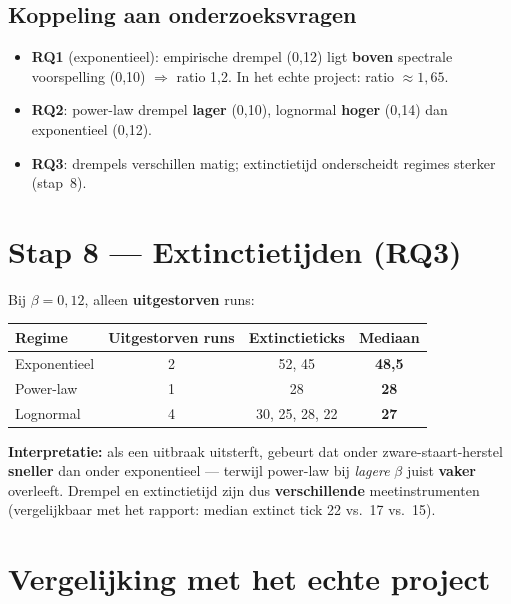 \documentclass[11pt,a4paper]{article}
\begin{document}
\subsection*{Koppeling aan onderzoeksvragen}

\begin{itemize}[leftmargin=*]
  \item \textbf{RQ1} (exponentieel): empirische drempel (0,12) ligt \textbf{boven} spectrale voorspelling (0,10) $\Rightarrow$ ratio 1,2. In het echte project: ratio $\approx 1{,}65$.
  \item \textbf{RQ2}: power-law drempel \textbf{lager} (0,10), lognormal \textbf{hoger} (0,14) dan exponentieel (0,12).
  \item \textbf{RQ3}: drempels verschillen matig; extinctietijd onderscheidt regimes sterker (stap~8).
\end{itemize}

\section{Stap 8 --- Extinctietijden (RQ3)}

Bij $\beta = 0{,}12$, alleen \textbf{uitgestorven} runs:

\begin{center}
\begin{tabular}{@{}lccc@{}}
\toprule
Regime & Uitgestorven runs & Extinctieticks & Mediaan \\
\midrule
Exponentieel & 2 & 52, 45 & \textbf{48,5} \\
Power-law & 1 & 28 & \textbf{28} \\
Lognormal & 4 & 30, 25, 28, 22 & \textbf{27} \\
\bottomrule
\end{tabular}
\end{center}

\textbf{Interpretatie:} als een uitbraak uitsterft, gebeurt dat onder zware-staart-herstel \textbf{sneller} dan onder exponentieel --- terwijl power-law bij \emph{lagere} $\beta$ juist \textbf{vaker} overleeft. Drempel en extinctietijd zijn dus \textbf{verschillende} meetinstrumenten (vergelijkbaar met het rapport: median extinct tick 22 vs.\ 17 vs.\ 15).

\section{Vergelijking met het echte project}
\end{document}
